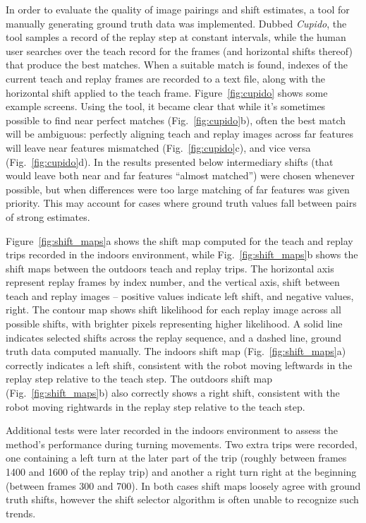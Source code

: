 \documentclass[twocolumn, 9pt,fleqn]{jsproceedings}
\begin{document}
In order to evaluate the quality of image pairings and shift estimates, a tool for manually generating ground truth data was implemented. Dubbed \textit{Cupido}, the tool samples a record of the replay step at constant intervals, while the human user searches over the teach record for the frames (and horizontal shifts thereof) that produce the best matches. When a suitable match is found, indexes of the current teach and replay frames are recorded to a text file, along with the horizontal shift applied to the teach frame. Figure~\ref{fig:cupido} shows some example screens. Using the tool, it became clear that while it's sometimes possible to find near perfect matches (Fig.~\ref{fig:cupido}b), often the best match will be ambiguous: perfectly aligning teach and replay images across far features will leave near features mismatched (Fig.~\ref{fig:cupido}c), and vice versa (Fig.~\ref{fig:cupido}d). In the results presented below intermediary shifts (that would leave both near and far features ``almost matched'') were chosen whenever possible, but when differences were too large matching of far features was given priority. This may account for cases where ground truth values fall between pairs of strong estimates.

Figure~\ref{fig:shift_maps}a shows the shift map computed for the teach and replay trips recorded in the indoors environment, while Fig.~\ref{fig:shift_maps}b shows the shift maps between the outdoors teach and replay trips. The horizontal axis represent replay frames by index number, and the vertical axis, shift between teach and replay images -- positive values indicate left shift, and negative values, right. The contour map shows shift likelihood for each replay image across all possible shifts, with brighter pixels representing higher likelihood. A solid line indicates selected shifts across the replay sequence, and a dashed line, ground truth data computed manually. The indoors shift map (Fig.~\ref{fig:shift_maps}a) correctly indicates a left shift, consistent with the robot moving leftwards in the replay step relative to the teach step. The outdoors shift map (Fig.~\ref{fig:shift_maps}b) also correctly shows a right shift, consistent with the robot moving rightwards in the replay step relative to the teach step.

Additional tests were later recorded in the indoors environment to assess the method's performance during turning movements. Two extra trips were recorded, one containing a left turn at the later part of the trip (roughly between frames 1400 and 1600 of the replay trip) and another a right turn right at the beginning (between frames 300 and 700). In both cases shift maps loosely agree with ground truth shifts, however the shift selector algorithm is often unable to recognize such trends.
\end{document}
